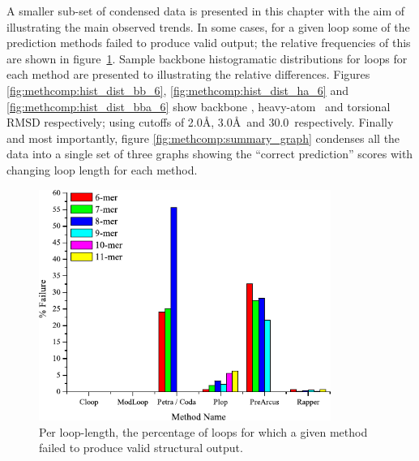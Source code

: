 A smaller sub-set of condensed data is presented in this chapter with the aim of illustrating the main observed trends.
In some cases, for a given loop some of the prediction methods failed to produce valid output; the relative frequencies of this are shown in \mbox{figure \ref{fig:methcomp:fail_rate}}. Sample backbone histogramatic distributions for  loops for each method are presented to illustrating the relative differences. Figures \ref{fig:methcomp:hist_dist_bb_6}, \ref{fig:methcomp:hist_dist_ha_6} and \ref{fig:methcomp:hist_dist_bba_6} show backbone \crms, heavy-atom \crms\ and  torsional RMSD respectively; using cutoffs of 2.0\AA, 3.0\AA\ and 30.0\degree\ respectively.  Finally and most importantly, figure \ref{fig:methcomp:summary_graph} condenses all the data into a single set of three graphs showing the ``correct prediction'' scores with changing loop length for each method.




\begin{figure}[hptb]
  \begin{center}
      \includegraphics[width=0.85\textwidth]{08-MethodComparison/meth_fail/meth_fail.pdf}
  \end{center}
  \caption{Per loop-length, the percentage of loops for which a given method failed to produce valid structural output.}
\label{fig:methcomp:fail_rate}
\end{figure}


